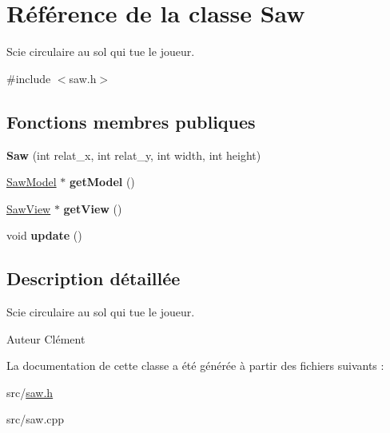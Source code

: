 \hypertarget{class_saw}{\section{Référence de la classe Saw}
\label{class_saw}
}


Scie circulaire au sol qui tue le joueur.  




{\ttfamily \#include $<$saw.\+h$>$}

\subsection*{Fonctions membres publiques}
\begin{DoxyCompactItemize}
\item 
\hypertarget{class_saw_a889e86730c1d6fc1c3e12b20de713277}{{\bfseries Saw} (int relat\+\_\+x, int relat\+\_\+y, int width, int height)}\label{class_saw_a889e86730c1d6fc1c3e12b20de713277}

\item 
\hypertarget{class_saw_a4cf94b07e63457fbb46a67c87ce76d6e}{\hyperlink{class_saw_model}{Saw\+Model} $\ast$ {\bfseries get\+Model} ()}\label{class_saw_a4cf94b07e63457fbb46a67c87ce76d6e}

\item 
\hypertarget{class_saw_a1d5d8efd28e75248af1ba97f98a7623c}{\hyperlink{class_saw_view}{Saw\+View} $\ast$ {\bfseries get\+View} ()}\label{class_saw_a1d5d8efd28e75248af1ba97f98a7623c}

\item 
\hypertarget{class_saw_a086e48b27d8095e25a62ad63da79272b}{void {\bfseries update} ()}\label{class_saw_a086e48b27d8095e25a62ad63da79272b}

\end{DoxyCompactItemize}


\subsection{Description détaillée}
Scie circulaire au sol qui tue le joueur. 

\begin{DoxyAuthor}{Auteur}
Clément 
\end{DoxyAuthor}


La documentation de cette classe a été générée à partir des fichiers suivants \+:\begin{DoxyCompactItemize}
\item 
src/\hyperlink{saw_8h}{saw.\+h}\item 
src/saw.\+cpp\end{DoxyCompactItemize}
